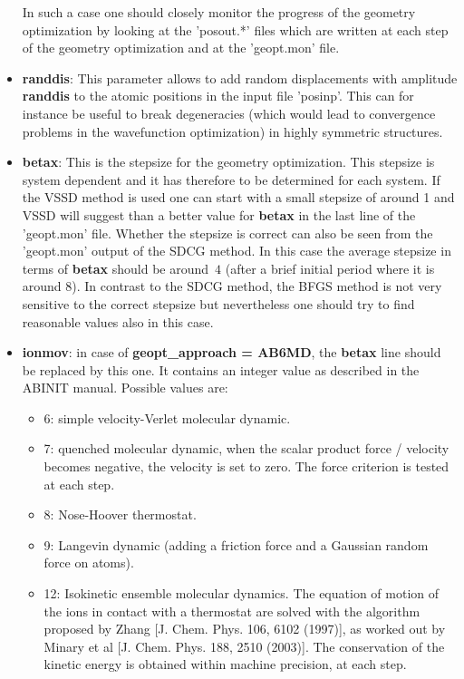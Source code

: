 \documentclass[a4paper,11pt]{report}
\begin{document}
\begin{itemize}
      In such a case one should 
      closely monitor the progress of the geometry optimization by looking at the 'posout.*' 
      files which are written at each step of the geometry optimization and at the 'geopt.mon' file. 
\item {\bf randdis}: This parameter allows to add random displacements 
      with amplitude \textbf{randdis} to the atomic positions in the 
      input file 'posinp'. This can for instance be useful to break degeneracies (which would lead to 
      convergence problems in the wavefunction optimization) in highly symmetric structures.
\item {\bf betax}: This is the stepsize for the geometry optimization. 
      This stepsize is system dependent and it has therefore to be 
      determined for each system. If the VSSD method is used one can start with a small stepsize of around 1 and 
      VSSD will suggest than a better value for {\bf betax} in the last line of the 'geopt.mon' file. 
      Whether the stepsize is correct can also be seen from the 'geopt.mon' output of the SDCG method. In this 
      case the average stepsize in terms of \textbf{betax} should be around~$4$
      (after a brief initial period where it is around 8).
      In contrast to the SDCG method, the BFGS method is not very sensitive to the correct stepsize but nevertheless 
      one should try to find reasonable values also in this case.
\item \textbf{ionmov}: in case of {\bf geopt\_approach = AB6MD}, the {\bf betax} line should be replaced by this one. It contains an integer value as described in the ABINIT manual. Possible values are:
      \begin{itemize}
      \item 6: simple velocity-Verlet molecular dynamic.
      \item 7: quenched molecular dynamic, when the scalar product force / velocity becomes negative, 
            the velocity is set to zero. The force criterion is tested at each step.
      \item 8: Nose-Hoover thermostat.
      \item 9: Langevin dynamic (adding a friction force and a Gaussian random force on atoms).
      \item 12: Isokinetic ensemble molecular dynamics. The equation of motion of the ions in contact with a thermostat are solved with the algorithm proposed by Zhang [J. Chem. Phys. 106, 6102 (1997)], as worked out by Minary et al [J. Chem. Phys. 188, 2510 (2003)]. The conservation of the kinetic energy is obtained within machine precision, at each step.

\end{itemize}
\end{itemize}
\end{document}
